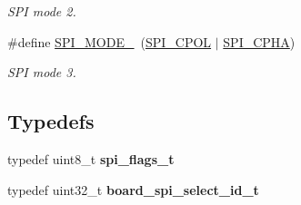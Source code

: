 \begin{DoxyCompactItemize}
\begin{DoxyCompactList}\small\item\em S\-P\-I mode 2. \end{DoxyCompactList}\item 
\hypertarget{group__xmega__spi__master__group_ga6a091da9f9011457fe28ab25f64c858d}{\#define \hyperlink{group__xmega__spi__master__group_ga6a091da9f9011457fe28ab25f64c858d}{S\-P\-I\-\_\-\-M\-O\-D\-E\-\_}~(\hyperlink{group__xmega__spi__master__group_gad8e335b1f808bd7408d2aef2377adcb1}{S\-P\-I\-\_\-\-C\-P\-O\-L} $|$ \hyperlink{group__xmega__spi__master__group_ga49e8927a636f45641d6231ac63b9e598}{S\-P\-I\-\_\-\-C\-P\-H\-A})}\label{group__xmega__spi__master__group_ga6a091da9f9011457fe28ab25f64c858d}

\begin{DoxyCompactList}\small\item\em S\-P\-I mode 3. \end{DoxyCompactList}\end{DoxyCompactItemize}
\subsection*{Typedefs}
\begin{DoxyCompactItemize}
\item 
\hypertarget{group__xmega__spi__master__group_ga781db101a4c4490735eb12d3cb92fde7}{typedef uint8\-\_\-t {\bfseries spi\-\_\-flags\-\_\-t}}\label{group__xmega__spi__master__group_ga781db101a4c4490735eb12d3cb92fde7}

\item 
\hypertarget{group__xmega__spi__master__group_ga4a28574ec2d052b3fcffd1d7c423a52a}{typedef uint32\-\_\-t {\bfseries board\-\_\-spi\-\_\-select\-\_\-id\-\_\-t}}\label{group__xmega__spi__master__group_ga4a28574ec2d052b3fcffd1d7c423a52a}

\end{DoxyCompactItemize}
